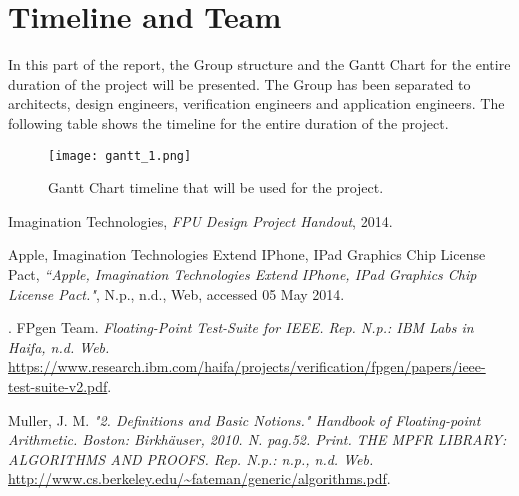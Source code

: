 \documentclass[11pt]{report}
\begin{document}
\clearpage
\section{Timeline and Team}
In this part of the report, the Group structure and the Gantt Chart for the entire duration of the project will be presented. The Group has been separated to architects, design engineers, verification engineers and application engineers. The following table shows the timeline for the entire duration of the project.
\begin{figure}[H]
\centering
\texttt{[image: gantt\_1.png]}
\caption{Gantt Chart timeline that will be used for the project. }
\end{figure}


\pagebreak

\renewcommand{\bibname}{\Large \arabic{section}. References \vspace{-1.5em}}
\begin{thebibliography}{9}

 Imagination Technologies, 
 \emph{FPU Design Project Handout}, 
 2014.
  
 Apple, Imagination Technologies Extend IPhone, IPad Graphics Chip License Pact,
 \emph{``Apple, Imagination Technologies Extend IPhone, IPad Graphics Chip License Pact."}, 
 N.p., n.d., Web, accessed 05 May 2014.

.
FPgen Team. 
\emph{Floating-Point Test-Suite for IEEE. Rep. N.p.: IBM Labs in Haifa, n.d. Web.} \url{https://www.research.ibm.com/haifa/projects/verification/fpgen/papers/ieee-test-suite-v2.pdf}.


Muller, J. M. 
\emph{"2. Definitions and Basic Notions." Handbook of Floating-point Arithmetic. Boston: Birkhäuser, 2010. N. pag.52. Print.}
\emph{THE MPFR LIBRARY: ALGORITHMS AND PROOFS. Rep. N.p.: n.p., n.d. Web.} \url{http://www.cs.berkeley.edu/~fateman/generic/algorithms.pdf}.


\end{thebibliography}
\end{document}
